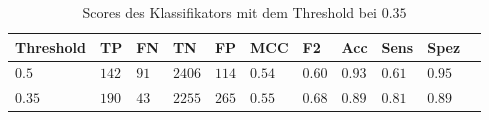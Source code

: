 \begin{table}[htb!]
\begin{center}
\begin{tabular}{lllllllllll}
	\toprule
 	Threshold  & TP & FN & TN & FP & MCC & F2 & Acc & Sens & Spez\\
	\midrule
    $0.5$ & $142$&	$91$ &	$2406$ &	$114$ &	$0.54$ 	&$0.60$	&$0.93$	&$0.61$&	$0.95$ \\
	$0.35$ & $190$ & $43$ &	$2255$ &	$265$ &	$0.55$ &	$0.68$&	$0.89$ &	$0.81$ & $0.89$\\
 \bottomrule
 \end{tabular}
 \end{center}
  \caption{Scores des Klassifikators mit dem Threshold bei $0.35$}
 \label{tab:final_scores}
 \end{table}

